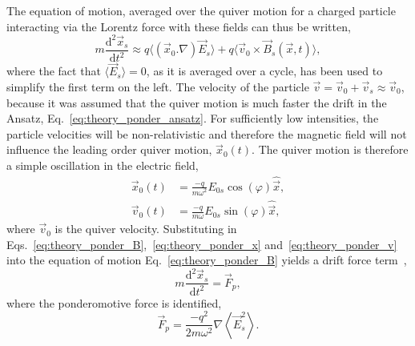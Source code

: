 The equation of motion, averaged over the quiver motion for a charged particle interacting via the Lorentz force with these fields can thus be written,
\begin{equation}
    \label{eq:theory_ponder_eom}
    m \frac{\text{d}^2 \vec{x}_s}{\text{d}t^2} \approx q\langle \left( \vec{x}_0.\nabla \right) \vec{E}_s \rangle + q\langle \vec{v}_0\times \vec{B}_s(\vec{x},t) \rangle,
\end{equation}
where the fact that $\langle\vec{E}_s\rangle=0$, as it is averaged over a cycle, has been used to simplify the first term on the left.
The velocity of the particle $\vec{v}=\vec{v}_0 + \vec{v}_s \approx \vec{v}_0$, because it was assumed that the quiver motion is much faster the drift in the Ansatz, Eq.~\ref{eq:theory_ponder_ansatz}.
For sufficiently low intensities, the particle velocities will be non-relativistic and therefore the magnetic field will not influence the leading order quiver motion, $\vec{x}_0(t)$.
The quiver motion is therefore a simple oscillation in the electric field,
\begin{align}
    \label{eq:theory_ponder_x}
    \vec{x}_0(t) &= \frac{-q}{m \omega^2} E_{0s} \cos{\left(\varphi\right)} \hat{\vec{x}},\\
    \label{eq:theory_ponder_v}
    \vec{v}_0(t) &= \frac{-q}{m \omega} E_{0s} \sin{\left(\varphi\right)} \hat{\vec{x}},
\end{align}
where $\vec{v}_0$ is the quiver velocity.
Substituting in Eqs.~\ref{eq:theory_ponder_B},~\ref{eq:theory_ponder_x} and~\ref{eq:theory_ponder_v} into the equation of motion Eq.~\ref{eq:theory_ponder_B} yields a drift force term~\cite{michel_introduction_2023},
\begin{equation}
    \label{eq:theory_ponder_eom2}
    m \frac{\text{d}^2 \vec{x}_s}{\text{d}t^2} = \vec{F}_p,
\end{equation}
where the ponderomotive force is identified,
\begin{equation}
    \label{eq:theory_ponder_force}
    \vec{F}_p = \frac{-q^2}{2m\omega^2}\nabla \left\langle \vec{E}_s^2 \right\rangle.
\end{equation}


